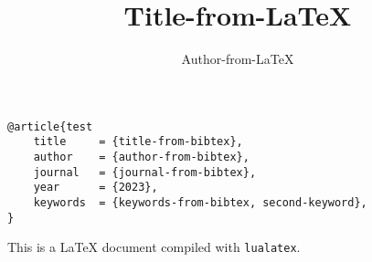 \documentclass{article}
\title{Title-from-LaTeX}
\author{Author-from-LaTeX}
\begin{document}
    \begin{verbatim}
@article{test
    title     = {title-from-bibtex},
    author    = {author-from-bibtex},
    journal   = {journal-from-bibtex},
    year      = {2023},
    keywords  = {keywords-from-bibtex, second-keyword},
}
    \end{verbatim}
    \clearpage
    \maketitle
    This is a \LaTeX{} document compiled with \texttt{lualatex}.
\end{document}
